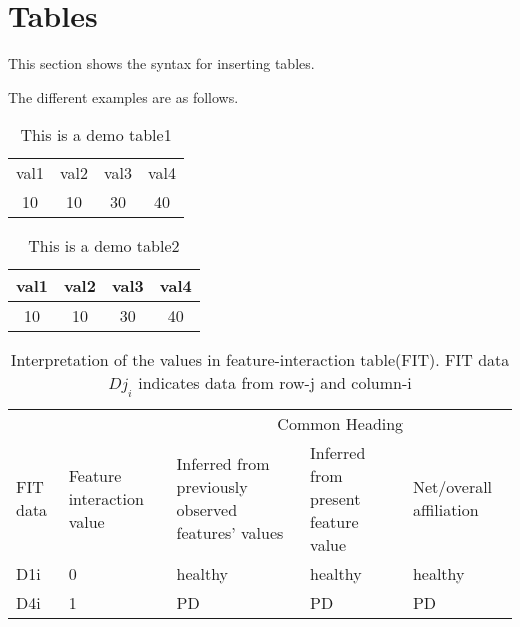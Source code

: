 \documentclass[journal] {article}
\begin{document}
\section{Tables}

This section shows the syntax for inserting tables.

The different examples are as follows.


\begin{table}[htbp]
	\centering
		\begin{tabular}{c|c|c|c|}
			val1 & val2 & val3 & val4 \\
			10 & 10 & 30 & 40\\
		\end{tabular}
		\caption{This is a demo table1} 
\end{table}




\begin{table}[htbp]
	\centering
	\caption{This is a demo table2}
		\begin{tabular}{|c|c|c|c|} \hline
			val1 & val2 & val3 & val4 \\ \hline
			10 & 10 & 30 & 40\\ \hline
		\end{tabular}
		 
		\label{table1}
\end{table}


\begin{table}[t]
\caption{Interpretation of the values in feature-interaction table(FIT). FIT data $Dj_i$ indicates data from row-j and column-i}
			\centering	 
				{\begin{tabular} {| p{0.4in} | p{0.6in} | p{1in} | p{1in} | p{0.7in} | }\hline
				& &\multicolumn{3}{|c|}{Common Heading} \\ \cline{3-5}
				FIT data & Feature interaction value & Inferred from previously observed features' values &Inferred from present feature value & Net/overall affiliation\\ \hline
				D1i & 0& healthy & healthy & healthy\\ %
				D4i & 1&PD & PD & PD\\ \hline
				\end{tabular}
			}
		\label{table2}
	\end{table}
\end{document}

